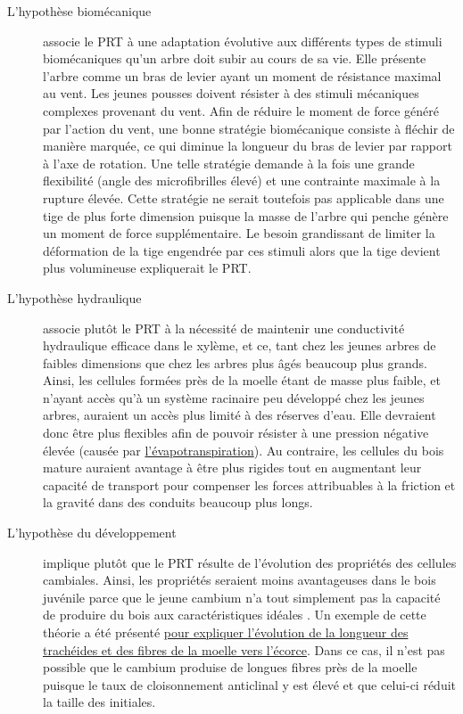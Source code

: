 \begin{description}
\item[L'hypothèse biomécanique] associe le PRT à une adaptation évolutive aux différents types de stimuli biomécaniques qu'un arbre doit subir au cours de sa vie. Elle présente l'arbre comme un bras de levier ayant un moment de résistance maximal au vent. Les jeunes pousses doivent résister à des stimuli mécaniques complexes provenant du vent. Afin de réduire le moment de force généré par l'action du vent, une bonne stratégie biomécanique consiste à fléchir de manière marquée, ce qui diminue la longueur du bras de levier par rapport à l'axe de rotation. Une telle stratégie demande à la fois une grande flexibilité (angle des microfibrilles élevé) et une contrainte maximale à la rupture élevée. Cette stratégie ne serait toutefois pas applicable dans une tige de plus forte dimension puisque la masse de l'arbre qui penche génère un moment de force supplémentaire. Le besoin grandissant de limiter la déformation de la tige engendrée par ces stimuli alors que la tige devient plus volumineuse expliquerait le PRT.

\item[L'hypothèse hydraulique] associe plutôt le PRT à la nécessité de maintenir une conductivité hydraulique efficace dans le xylème, et ce, tant chez les jeunes arbres de faibles dimensions que chez les arbres plus âgés beaucoup plus grands. Ainsi, les cellules formées près de la moelle étant de masse plus faible, et n'ayant accès qu'à un système racinaire peu développé chez les jeunes arbres, auraient un accès plus limité à des réserves d'eau. Elle devraient donc être plus flexibles afin de pouvoir résister à une pression négative élevée (causée par \hyperref[eau]{l'évapotranspiration}). Au contraire, les cellules du bois mature auraient avantage à être plus rigides tout en augmentant leur capacité de transport pour compenser les forces attribuables à la friction et la gravité dans des conduits beaucoup plus longs.

\item[L'hypothèse du développement] implique plutôt que le PRT résulte de l'évolution des propriétés des cellules cambiales. Ainsi, les propriétés seraient moins avantageuses dans le bois juvénile parce que le jeune cambium n'a tout simplement pas la capacité de produire du bois aux caractéristiques \og idéales \fg. Un exemple de cette théorie a été présenté \hyperref[prt_longueur]{pour expliquer l'évolution de la longueur des trachéides et des fibres de la moelle vers l'écorce}. Dans ce cas, il n'est pas possible que le cambium produise de longues fibres près de la moelle puisque le taux de cloisonnement anticlinal y est élevé et que celui-ci réduit la taille des initiales.\\
\end{description}

